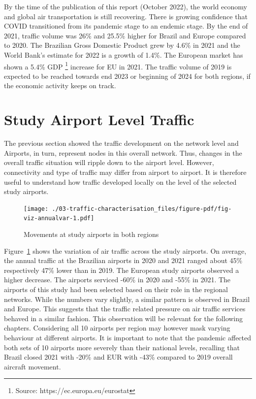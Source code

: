 \documentclass[
  a4paper,
  DIV=11,
  numbers=noendperiod]{scrreprt}
\begin{document}
By the time of the publication of this report (October 2022), the world
economy and global air transportation is still recovering. There is
growing confidence that COVID transitioned from its pandemic stage to an
endemic stage. By the end of 2021, traffic volume was 26\% and 25.5\%
higher for Brazil and Europe compared to 2020. The Brazilian Gross
Domestic Product grew by 4.6\% in 2021 and the World Bank's estimate for
2022 is a growth of 1.4\%. The European market has shown a 5.4\% GDP
\footnote{Source: https://ec.europa.eu/eurostat} increase for EU in
2021. The traffic volume of 2019 is expected to be reached towards end
2023 or beginning of 2024 for both regions, if the economic activity
keeps on track.

\hypertarget{study-airport-level-traffic}{%
\section{Study Airport Level
Traffic}\label{study-airport-level-traffic}}

The previous section showed the traffic development on the network level
and Airports, in turn, represent nodes in this overall network. Thus,
changes in the overall traffic situation will ripple down to the airport
level. However, connectivity and type of traffic may differ from airport
to airport. It is therefore useful to understand how traffic developed
locally on the level of the selected study airports.

\begin{figure}[h]

{\centering \texttt{[image: ./03-traffic-characterisation\_files/figure-pdf/fig-viz-annualvar-1.pdf]}

}

\caption{\label{fig-viz-annualvar}Movements at study airports in both
regions}

\end{figure}

Figure~\ref{fig-viz-annualvar} shows the variation of air traffic across
the study airports. On average, the annual traffic at the Brazilian
airports in 2020 and 2021 ranged about 45\% respectively 47\% lower than
in 2019. The European study airports observed a higher decrease. The
airports serviced -60\% in 2020 and -55\% in 2021. The airports of this
study had been selected based on their role in the regional networks.
While the numbers vary slightly, a similar pattern is observed in Brazil
and Europe. This suggests that the traffic related pressure on air
traffic services behaved in a similar fashion. This observation will be
relevant for the following chapters. Considering all 10 airports per
region may however mask varying behaviour at different airports. It is
important to note that the pandemic affected both sets of 10 airports
more severely than their national levels, recalling that Brazil closed
2021 with -20\% and EUR with -43\% compared to 2019 overall aircraft
movement.
\end{document}
